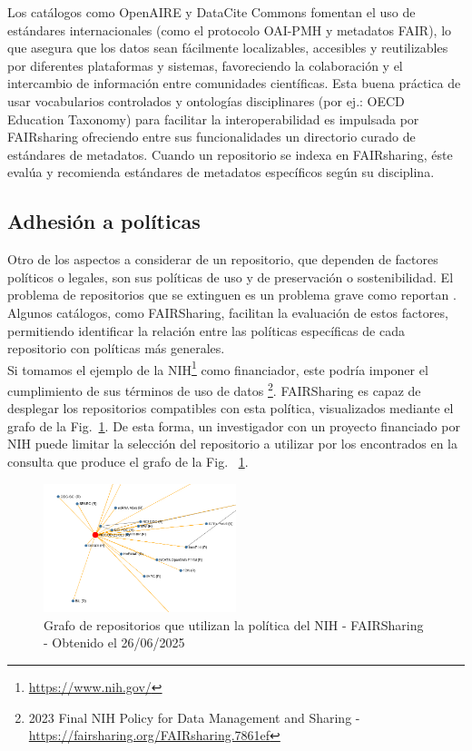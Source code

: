 \documentclass[runningheads]{llncs}
\begin{document}
Los catálogos como OpenAIRE y DataCite Commons fomentan el uso de estándares internacionales (como el protocolo OAI-PMH y metadatos FAIR), lo que asegura que los datos sean fácilmente localizables, accesibles y reutilizables por diferentes plataformas y sistemas, favoreciendo la colaboración y el intercambio de información entre comunidades científicas. Esta buena práctica de usar vocabularios controlados
y ontologías disciplinares (por ej.:  OECD Education Taxonomy) para facilitar la interoperabilidad es impulsada por FAIRsharing  ofreciendo entre sus funcionalidades un directorio curado de estándares de metadatos. Cuando un repositorio se indexa  en FAIRsharing, éste evalúa y recomienda estándares de metadatos específicos según su disciplina. \\

\subsection*{Adhesión a políticas}
Otro de los aspectos a considerar de un repositorio, que dependen de factores políticos o legales, son sus políticas de uso y de preservación o sostenibilidad. 
El problema de repositorios que se extinguen es un problema grave como reportan \citet{strecker_disappearing_repos_23}.
Algunos catálogos, como FAIRSharing, facilitan la evaluación de estos factores, permitiendo identificar la relación entre las políticas específicas de cada repositorio con políticas más generales.\\
Si tomamos el ejemplo de la NIH\footnote{\url{https://www.nih.gov/}} como financiador, este podría imponer el cumplimiento de sus términos de uso de datos \footnote{\label{nih_policy_fairsharing} 2023 Final NIH Policy for Data Management and Sharing - \url{https://fairsharing.org/FAIRsharing.7861ef}}. FAIRSharing es capaz de desplegar los repositorios compatibles con esta política, visualizados mediante el grafo de la Fig.~\ref{fig:fairsharing_nih_policy_repo_usages}. De esta forma, un investigador con un proyecto financiado por NIH puede limitar la selección del repositorio a utilizar por los encontrados en la consulta que produce el grafo de la Fig. ~\ref{fig:fairsharing_nih_policy_repo_usages}.\\


\begin{figure}[h]
    \includegraphics[width=0.5\textwidth]{img/FAIRSharing_NIHPol_Repos.png}
    \caption{
    Grafo de repositorios que utilizan la política del NIH - FAIRSharing - Obtenido el 26/06/2025
    }
    \label{fig:fairsharing_nih_policy_repo_usages}
\end{figure}
\end{document}
